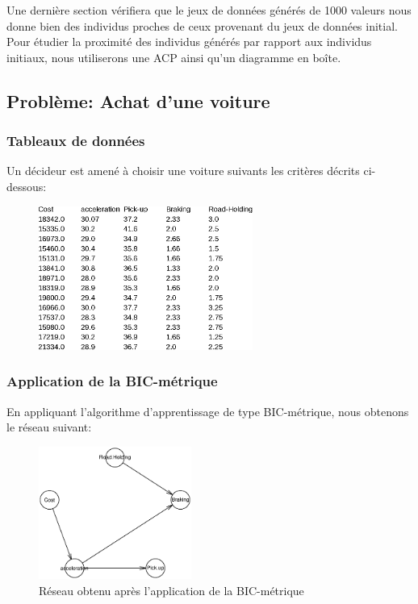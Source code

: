 \documentclass[a4paper]{article}
\begin{document}
Une dernière section vérifiera que le jeux de données générés de 1000 valeurs nous donne bien des individus proches de ceux provenant  du jeux de données initial. Pour étudier la proximité des individus générés par rapport aux individus initiaux, nous utiliserons une ACP ainsi qu'un diagramme en boîte.

\newpage
\subsection{Problème: Achat d'une voiture}
\subsubsection{Tableaux de données}
Un décideur est amené à choisir une voiture suivants les critères décrits ci-dessous: 

\begin{figure}[H] 
    \center
    \includegraphics[width=7cm]{Thierry.eps} 
    \label{figdepart}
\end{figure} 

\subsubsection{Application de la BIC-métrique}

En appliquant l'algorithme d'apprentissage de type BIC-métrique, nous obtenons le réseau suivant:

\begin{figure}[H] 
    \center
    \includegraphics[width=5cm]{THIERRY_GRAPHE.eps} 
    \caption{Réseau obtenu après l'application de la BIC-métrique} 
	\label{bicmetric}
\end{figure}
\end{document}

